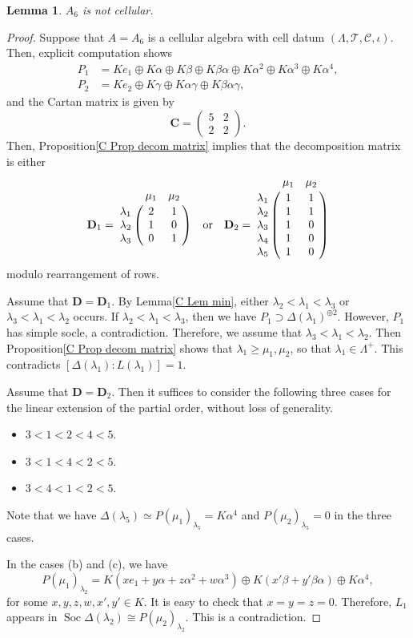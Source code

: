 \documentclass[12pt]{amsart}
\newtheorem{lem}[thm]{Lemma}
\numberwithin{equation}{thm}
\newcommand\bC{\mathbf C}
\newcommand\bD{\mathbf D}
\newcommand\cC{\mathcal{C}}
\newcommand\cT{\mathcal{T}}
\newcommand\Soc{\operatorname{Soc}}
\begin{document}
{\begin{lem}
\label{P A6}
$A_6$ is not cellular.
\end{lem}
\begin{proof}
Suppose that $A=A_6$ is a cellular algebra with cell datum $(\Lambda,\cT,\cC,\iota)$. 
Then, explicit computation shows
\begin{align*}
P_1 &=
Ke_1\oplus K\alpha\oplus K\beta\oplus K\beta\alpha\oplus K\alpha^2\oplus K\alpha^3\oplus K\alpha^4, \\
P_2 &=
Ke_2\oplus K\gamma\oplus K\alpha\gamma\oplus K\beta\alpha\gamma,
\end{align*}
and the Cartan matrix is given by
\[
\bC=\begin{pmatrix} 5 & 2 \\ 2 & 2 \end{pmatrix}.
\]
Then, 
Proposition\;\ref{C Prop decom matrix} implies that the decomposition matrix is either
 \[\bD_1=\bordermatrix{
& \mu_1 & \mu_2 \cr
\lambda_1 & 2 & 1 \cr
\lambda_2 & 1 & 0 \cr
\lambda_3 & 0 & 1 \cr
}
\quad \text{or} \quad 
\bD_2=\bordermatrix{
& \mu_1 & \mu_2 \cr
\lambda_1 & 1 & 1 \cr
\lambda_2 & 1 & 1 \cr
\lambda_3 & 1 & 0 \cr
\lambda_4 & 1 & 0 \cr
\lambda_5 & 1 & 0 \cr
}
\]
modulo rearrangement of rows.

Assume that $\bD=\bD_1$.
By Lemma\;\ref{C Lem min}, either $\lambda_2<\lambda_1<\lambda_3$ or
$\lambda_3<\lambda_1<\lambda_2$ occurs.
If $\lambda_2<\lambda_1<\lambda_3$, then we have $P_1\supset \Delta(\lambda_1)^{\oplus 2}$.
However, $P_1$ has simple socle, a contradiction.
Therefore, we assume that $\lambda_3<\lambda_1<\lambda_2$. 
Then Proposition\;\ref{C Prop decom matrix} shows that
$\lambda_1\geq \mu_1,\mu_2$, so that $\lambda_1\in \Lambda^+$. This contradicts 
$[\Delta(\lambda_1):L(\lambda_1)]=1$.
 
Assume that $\bD=\bD_2$. Then it suffices to consider 
the following three cases for the linear extension of the partial order, without loss of generality.
\begin{itemize}
\item[(a)]
$3<1<2<4<5$.
\item[(b)]
$3<1<4<2<5$.
\item[(c)]
$3<4<1<2<5$.
\end{itemize}
Note that we have $\Delta(\lambda_5)\simeq P(\mu_1)_{\lambda_5}=K \alpha^4$
and $P(\mu_2)_{\lambda_5}=0$ in the three cases.  

In the cases (b) and (c), we have
\[P(\mu_1)_{\lambda_2}=K(xe_1+y\alpha+z\alpha^2+w\alpha^3)\oplus K(x'\beta+y'\beta\alpha)\oplus 
K\alpha^4,\]
for some $x,y,z,w,x',y'\in K$. It is easy to check that $x=y=z=0$. Therefore,
$L_1$ appears in $\Soc \Delta(\lambda_2)\cong P(\mu_2)_{\lambda_2}.$
This is a contradiction.


\end{proof}}
\end{document}
